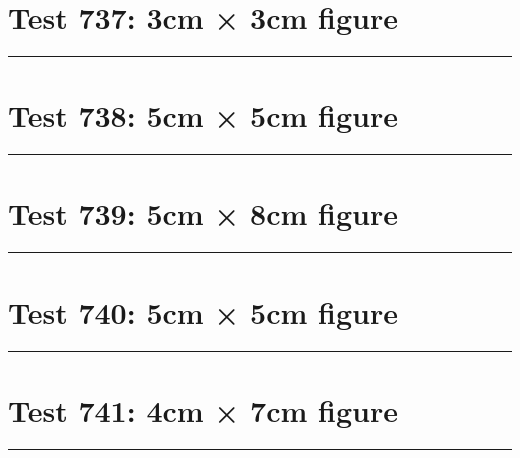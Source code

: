 \documentclass[a4paper,11pt]{article}
\begin{document}
\section*{Test 737: 3cm × 3cm figure}
\begin{swarmwrap}%
  \begin{minipage}[t]{3cm}
    \centering
    \rule{\linewidth}{3cm}
  \end{minipage}%
\end{swarmwrap}%
\swarmwrapnext
\lipsum[32]
\lipsum[33]
\lipsum[34]
\lipsum[35]
\lipsum[36]
\lipsum[37]
\section*{Test 738: 5cm × 5cm figure}
\begin{swarmwrap}%
  \begin{minipage}[t]{5cm}
    \centering
    \rule{\linewidth}{5cm}
  \end{minipage}%
\end{swarmwrap}%
\swarmwrapnext
\lipsum[91]
\lipsum[92]
\lipsum[93]
\lipsum[94]
\section*{Test 739: 5cm × 8cm figure}
\begin{swarmwrap}%
  \begin{minipage}[t]{5cm}
    \centering
    \rule{\linewidth}{8cm}
  \end{minipage}%
\end{swarmwrap}%
\swarmwrapnext
\lipsum[37]
\lipsum[38]
\lipsum[39]
\lipsum[40]
\section*{Test 740: 5cm × 5cm figure}
\begin{swarmwrap}%
  \begin{minipage}[t]{5cm}
    \centering
    \rule{\linewidth}{5cm}
  \end{minipage}%
\end{swarmwrap}%
\swarmwrapnext
\lipsum[17]
\lipsum[18]
\lipsum[19]
\lipsum[20]
\section*{Test 741: 4cm × 7cm figure}
\begin{swarmwrap}%
  \begin{minipage}[t]{4cm}
    \centering
    \rule{\linewidth}{7cm}
  \end{minipage}%
\end{swarmwrap}%
\swarmwrapnext
\lipsum[139]
\lipsum[140]
\lipsum[141]
\lipsum[142]
\lipsum[143]
\end{document}
